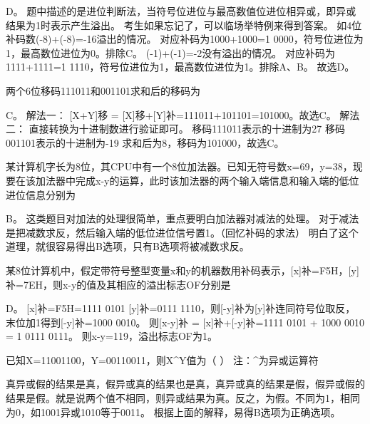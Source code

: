 \begin{solution}D。
题中描述的是进位判断法，当符号位进位与最高数值位进位相异或，即异或结果为1时表示产生溢出。
考生如果忘记了，可以临场举特例来得到答案。
如4位补码数(-8)+(-8)=-16溢出的情况。 对应补码为1000+1000=1
0000，符号位进位为1，最高数位进位为0。排除C。
(-1)+(-1)=-2没有溢出的情况。 对应补码为1111+1111=1
1110，符号位进位为1，最高数位进位为1。排除A、B。 故选D。
\end{solution}
\question 两个6位移码111011和001101求和后的移码为
\par{}
\begin{solution}C。 解法一： {[}X+Y{]}移 =
{[}X{]}移+{[}Y{]}补=111011+101101=101000。故选C。 解法二：
直接转换为十进制数进行验证即可。 移码111011表示的十进制为27
移码001101表示的十进制为-19 求和后为8，移码为101000，故选C。
\end{solution}
\question 某计算机字长为8位，其CPU中有一个8位加法器。已知无符号数x=69，y=38，现要在该加法器中完成x-y的运算，此时该加法器的两个输入端信息和输入端的低位进位信息分别为
\par{}
\begin{solution}B。 这类题目对加法的处理很简单，重点要明白加法器对减法的处理。
对于减法是把减数求反，然后输入端的低位进位信号置1。（回忆补码的求法）
明白了这个道理，就很容易得出B选项，只有B选项将被减数求反。
\end{solution}
\question 某8位计算机中，假定带符号整型变量x和y的机器数用补码表示，{[}x{]}补=F5H，{[}y{]}补=7EH，则x-y的值及其相应的溢出标志OF分别是
\par{}
\begin{solution}D。 {[}x{]}补=F5H=1111 0101 {[}y{]}补=0111
1110，则{[}-y{]}补为{[}y{]}补连同符号位取反，末位加1得到{[}-y{]}补=1000
0010。 则{[}x-y{]}补 = {[}x{]}补+{[}-y{]}补=1111 0101 + 1000 0010 = 1
0111 0111。 则x-y=119，溢出标志OF为1。
\end{solution}
\question 已知X=11001100，Y=00110011，则X\^{}Y值为（ ） 注：\^{}为异或运算符
\par{}
\begin{solution}真异或假的结果是真，假异或真的结果也是真，真异或真的结果是假，假异或假的结果是假。就是说两个值不相同，则异或结果为真。反之，为假。不同为1，相同为0，如1001异或1010等于0011。
根据上面的解释，易得B选项为正确选项。
\end{solution}
